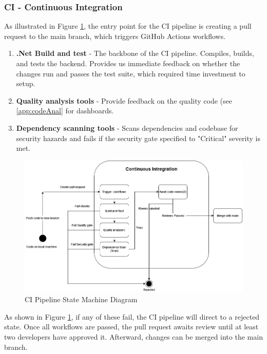 \subsubsection{CI - Continuous Integration}
\label{subsubsec:ci}
As illustrated in Figure \ref{fig:CIStateMachine}, the entry point for the CI pipeline is creating a pull request to the main branch, which triggers GitHub Actions workflows.
\begin{enumerate}
    \item \textbf{.Net Build and test} - The backbone of the CI pipeline. Compiles, builds, and tests the backend. Provides us immediate feedback on whether the changes run and passes the test suite, which required time investment to setup.
    \item \textbf{Quality analysis tools} - Provide feedback on the quality code (see \ref{app:codeAnal} for dashboards.
    \item \textbf{Dependency scanning tools} - Scans dependencies and codebase for security hazards and fails if the security gate specified to "Critical" severity is met.
\end{enumerate}


\begin {figure}[H]
    \centering
    \includegraphics[scale=0.50]{images/ci_cd_diagrams/DevopsDiagrams-StateMachine CI.drawio(4).png}
    \caption{CI Pipeline State Machine Diagram}
    \label{fig:CIStateMachine}
\end{figure}
As shown in Figure \ref{fig:CIStateMachine}, if any of these fail, the CI pipeline will direct to a rejected state. Once all workflows are passed, the pull request awaits review until at least two developers have approved it. Afterward, changes can be merged into the main branch.

